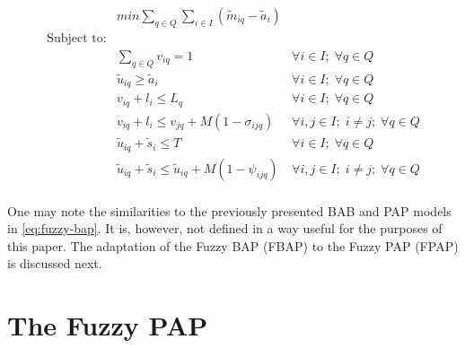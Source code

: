 \documentclass[11pt,a4paper,final]{article}
\let\ref\autoref                                      %
\begin{document}
\begin{equation}
\label{eq:fuzzy-bap}
\begin{array}{lll}
                   & min \sum_{q \in Q}\sum_{i \in I} (\tilde{m}_{iq} - \tilde{a}_i)           &                                \\
\text{Subject to:} &                                                             &                                    \\
                   & \sum_{q \in Q} v_{iq} = 1                                          & \forall i \in I;\; \forall q \in Q               \\
                   & \tilde{u}_{iq} \ge \tilde{a}_i                                 & \forall i \in I;\; \forall q \in Q                \\
                   & v_{iq} + l_i \le L_q                                           & \forall i \in I;\; \forall q \in Q                \\
                   & v_{iq} + l_i \le v_{jq} + M(1-\sigma_{ijq})                           & \forall i,j \in I;\; i \ne j;\; \forall q \in Q   \\
                   & \tilde{u}_{iq} + \tilde{s}_i \le T                             & \forall i \in I;\; \forall q \in Q                \\
                   & \tilde{u}_{iq} + \tilde{s}_i \le \tilde{u}_{iq} + M(1-\psi_{ijq})   & \forall i,j \in I;\; i \ne j;\; \forall q \in Q \\
\end{array}
\end{equation}

One may note the similarities to the previously presented BAB and PAP models in \ref{eq:fuzzy-bap}. It is, however, not
defined in a way useful for the purposes of this paper. The adaptation of the Fuzzy BAP (FBAP) to the Fuzzy PAP (FPAP)
is discussed next.

\section{The Fuzzy PAP}
\label{sec:org14e8aba}



\end{document}
